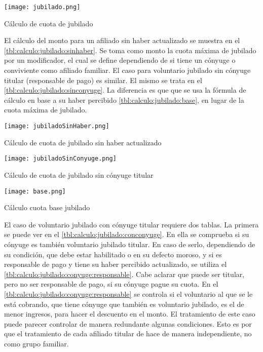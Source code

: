 \begin{table*}
    \centering
    \texttt{[image: jubilado.png]}
    \caption{Cálculo de cuota de jubilado}
    \label{tbl:calculo:jubilado:1}
\end{table*}

El cálculo del monto para un afiliado sin haber actualizado se muestra en el \cref{tbl:calculo:jubilado:sinhaber}.
Se toma como monto la cuota máxima de jubilado por un modificador, el cual se define dependiendo de si tiene un cónyuge o conviviente como afiliado familiar.
El caso para voluntario jubilado sin cónyuge titular (responsable de pago) es similar.
El mismo se trata en el \cref{tbl:calculo:jubilado:sinconyuge}.
La diferencia es que que se usa la fórmula de cálculo en base a su haber percibido \cref{tbl:calculo:jubilado:base}, en lugar de la cuota máxima de jubilado.

\begin{table*}
    \centering
    \texttt{[image: jubiladoSinHaber.png]}
    \caption{Cálculo de cuota de jubilado sin haber actualizado}
    \label{tbl:calculo:jubilado:sinhaber}
\end{table*}


\begin{table*}
    \centering
    \texttt{[image: jubiladoSinConyuge.png]}
    \caption{Cálculo de cuota de jubilado sin cónyuge titular}
    \label{tbl:calculo:jubilado:sinconyuge}
\end{table*}

\begin{table*}
    \centering
    \texttt{[image: base.png]}
    \caption{Cálculo cuota base jubilado}
    \label{tbl:calculo:jubilado:base}
\end{table*}

El caso de voluntario jubilado con cónyuge titular requiere dos tablas. 
La primera se puede ver en el \cref{tbl:calculo:jubilado:conconyuge}.
En ella se comprueba si su cónyuge es también voluntario jubilado titular.
En caso de serlo, dependiendo de su condición, que debe estar habilitado o en su defecto moroso, y si es responsable de pago y tiene su haber percibido actualizado, se utiliza el \cref{tbl:calculo:jubilado:conyuge:responsable}.
Cabe aclarar que puede ser titular, pero no ser responsable de pago, si su cónyuge pague su cuota. 
En el \cref{tbl:calculo:jubilado:conyuge:responsable} se controla si el voluntario al que se le está cobrando, que tiene cónyuge que también es voluntario jubilado, es el de menor ingresos, para hacer el descuento en el monto.
El tratamiento de este caso puede parecer controlar de manera redundante algunas condiciones. 
Esto es por que el tratamiento de cada afiliado titular de hace de manera independiente, no como grupo familiar.

